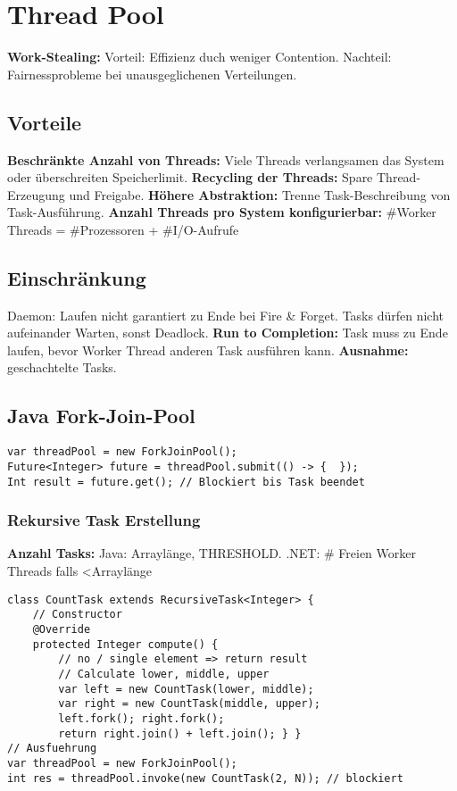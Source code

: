\section{Thread Pool}
\textbf{Work-Stealing:} Vorteil: Effizienz duch weniger Contention.
Nachteil: Fairnessprobleme bei unausgeglichenen Verteilungen.
\subsection{Vorteile}
\textbf{Beschränkte Anzahl von Threads:} Viele Threads verlangsamen das System oder überschreiten Speicherlimit. 
\textbf{Recycling der Threads:} Spare Thread-Erzeugung und Freigabe.
\textbf{Höhere Abstraktion:} Trenne Task-Beschreibung von Task-Ausführung.
\textbf{Anzahl Threads pro System konfigurierbar:} \#Worker Threads = \#Prozessoren + \#I/O-Aufrufe 

\subsection{Einschränkung}
Daemon: Laufen nicht garantiert zu Ende bei Fire \& Forget.
Tasks dürfen nicht aufeinander Warten, sonst Deadlock.
\textbf{Run to Completion:} Task muss zu Ende laufen, bevor Worker Thread anderen Task ausführen kann.
\textbf{Ausnahme:} geschachtelte Tasks.

\subsection{Java Fork-Join-Pool}
\begin{lstlisting}
var threadPool = new ForkJoinPool();
Future<Integer> future = threadPool.submit(() -> {  });
Int result = future.get(); // Blockiert bis Task beendet
\end{lstlisting}

\subsubsection{Rekursive Task Erstellung}
\textbf{Anzahl Tasks:} Java: Arraylänge, THRESHOLD.
.NET: \# Freien Worker Threads falls \textless Arraylänge
\begin{lstlisting}
class CountTask extends RecursiveTask<Integer> {
    // Constructor
    @Override
    protected Integer compute() {
        // no / single element => return result
        // Calculate lower, middle, upper
        var left = new CountTask(lower, middle);
        var right = new CountTask(middle, upper);
        left.fork(); right.fork();
        return right.join() + left.join(); } }
// Ausfuehrung 
var threadPool = new ForkJoinPool();
int res = threadPool.invoke(new CountTask(2, N)); // blockiert
\end{lstlisting}

